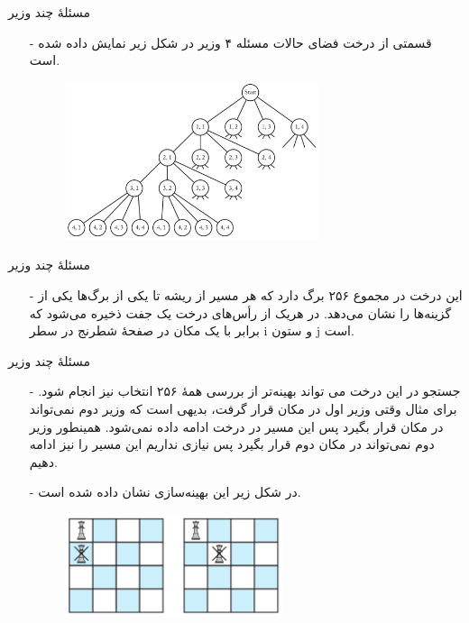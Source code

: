 \begin{frame}{مسئلهٔ چند وزیر}
\begin{itemize}\itemr
\item[-]
قسمتی از درخت فضای حالات مسئله ۴ وزیر در شکل زیر نمایش داده شده است.
\begin{figure}
\includegraphics[width=0.7\textwidth]{figs/chap06/n-queens-tree}
\end{figure}
\end{itemize}
\end{frame}


\begin{frame}{مسئلهٔ چند وزیر}
\begin{itemize}\itemr
\item[-]
این درخت در مجموع ۲۵۶ برگ دارد که هر مسیر از ریشه تا یکی از برگ‌ها یکی از گزینه‌ها را نشان می‌دهد. در هریک از رأس‌های درخت یک جفت
ذخیره می‌شود که برابر با یک مکان در صفحهٔ شطرنج در سطر i و ستون j است.
\end{itemize}
\end{frame}


\begin{frame}{مسئلهٔ چند وزیر}
\begin{itemize}\itemr
\item[-]
 جستجو در این درخت می تواند بهینه‌تر از بررسی همهٔ ۲۵۶ انتخاب نیز انجام شود. برای مثال وقتی وزیر اول در مکان
قرار گرفت، بدیهی است که وزیر دوم نمی‌تواند در مکان
قرار بگیرد پس این مسیر در درخت ادامه داده نمی‌شود. همینطور وزیر دوم نمی‌تواند در مکان دوم قرار بگیرد پس نیازی نداریم این مسیر را نیز ادامه دهیم.
\item[-]
در شکل زیر این بهینه‌سازی نشان داده شده است.
\begin{figure}
\includegraphics[width=0.6\textwidth]{figs/chap06/n-queens-opt}
\end{figure}
\end{itemize}
\end{frame}


